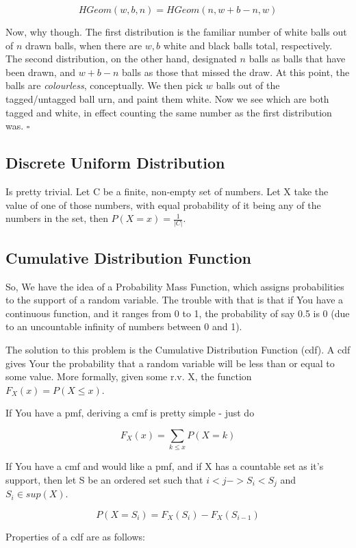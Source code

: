 \documentclass{article}
\newcommand{\qed}{\hfill$\square$}
\begin{document}
		$$HGeom(w, b, n) = HGeom(n, w+b-n, w)$$
		
		Now, why though. The first distribution is the familiar number of white balls out of $n$ drawn balls, when there are $w, b$ white and black balls total, respectively. The second distribution, on the other hand, designated $n$ balls as balls that have been drawn, and $w+b-n$ balls as those that missed the draw. At this point, the balls are \textit{colourless}, conceptually. We then pick $w$ balls out of the tagged/untagged ball urn, and paint them white. Now we see which are both tagged and white, in effect counting the same number as the first distribution was. \qed
		
	\subsection{Discrete Uniform Distribution}
	
		Is pretty trivial. Let C be a finite, non-empty set of numbers. Let X take the value of one of those numbers, with equal probability of it being any of the numbers in the set, then $P(X = x) = \frac{1}{\vert C \vert}$.
		
	\subsection{Cumulative Distribution Function}
	
		So, We have the idea of a Probability Mass Function, which assigns probabilities to the support of a random variable. The trouble with that is that if You have a continuous function, and it ranges from 0 to 1, the probability of say 0.5 is 0 (due to an uncountable infinity of numbers between 0 and 1).
		
		The solution to this problem is the Cumulative Distribution Function (cdf). A cdf gives Your the probability that a random variable will be less than or equal to some value. More formally, given some r.v. X, the function $F_X(x) = P(X \le x)$.
		
		If You have a pmf, deriving a cmf is pretty simple - just do
		
		$$F_X(x) = \sum_{k \le x} P(X = k)$$
		
		If You have a cmf and would like a pmf, and if X has a countable set as it's support, then let S be an ordered set such that $i < j -> S_i < S_j$ and $S_i \in sup(X)$.
		
		$$P(X = S_i) = F_X(S_i) - F_X(S_{i-1})$$
		
		Properties of a cdf are as follows:
		
\end{document}
